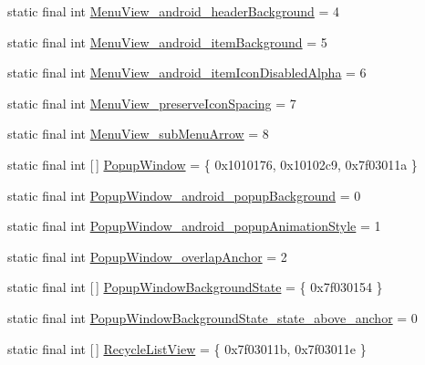 \begin{DoxyCompactItemize}
\item 
static final int \mbox{\hyperlink{classcom_1_1synnapps_1_1carouselview_1_1_r_1_1styleable_a17fdab04eb204e69fbcbed563676afb2}{Menu\+View\+\_\+android\+\_\+header\+Background}} = 4
\item 
static final int \mbox{\hyperlink{classcom_1_1synnapps_1_1carouselview_1_1_r_1_1styleable_aa55bae0fc19f133dc559536b1be7ed8b}{Menu\+View\+\_\+android\+\_\+item\+Background}} = 5
\item 
static final int \mbox{\hyperlink{classcom_1_1synnapps_1_1carouselview_1_1_r_1_1styleable_adb2be1da037bec8ef0a64ca3cefb3de7}{Menu\+View\+\_\+android\+\_\+item\+Icon\+Disabled\+Alpha}} = 6
\item 
static final int \mbox{\hyperlink{classcom_1_1synnapps_1_1carouselview_1_1_r_1_1styleable_a42f32d36d689c1de325eda857dc01e9e}{Menu\+View\+\_\+preserve\+Icon\+Spacing}} = 7
\item 
static final int \mbox{\hyperlink{classcom_1_1synnapps_1_1carouselview_1_1_r_1_1styleable_a616781a42431ad5f85efb4ff10d08d89}{Menu\+View\+\_\+sub\+Menu\+Arrow}} = 8
\item 
static final int \mbox{[}$\,$\mbox{]} \mbox{\hyperlink{classcom_1_1synnapps_1_1carouselview_1_1_r_1_1styleable_a8833d91df022e8350045960fdd9d6106}{Popup\+Window}} = \{ 0x1010176, 0x10102c9, 0x7f03011a \}
\item 
static final int \mbox{\hyperlink{classcom_1_1synnapps_1_1carouselview_1_1_r_1_1styleable_a630a70133d12b19b2500af51fb06df3f}{Popup\+Window\+\_\+android\+\_\+popup\+Background}} = 0
\item 
static final int \mbox{\hyperlink{classcom_1_1synnapps_1_1carouselview_1_1_r_1_1styleable_a50a01fce06eb8b14fae1e6f15f7f3cf5}{Popup\+Window\+\_\+android\+\_\+popup\+Animation\+Style}} = 1
\item 
static final int \mbox{\hyperlink{classcom_1_1synnapps_1_1carouselview_1_1_r_1_1styleable_af4d4712a00a9ea0f39cd1bc313597291}{Popup\+Window\+\_\+overlap\+Anchor}} = 2
\item 
static final int \mbox{[}$\,$\mbox{]} \mbox{\hyperlink{classcom_1_1synnapps_1_1carouselview_1_1_r_1_1styleable_a2197aa45b2a50d112fe0fd685c2a8299}{Popup\+Window\+Background\+State}} = \{ 0x7f030154 \}
\item 
static final int \mbox{\hyperlink{classcom_1_1synnapps_1_1carouselview_1_1_r_1_1styleable_a6f848bb987c5906511674e5eb6cbb72a}{Popup\+Window\+Background\+State\+\_\+state\+\_\+above\+\_\+anchor}} = 0
\item 
static final int \mbox{[}$\,$\mbox{]} \mbox{\hyperlink{classcom_1_1synnapps_1_1carouselview_1_1_r_1_1styleable_a52bebb9fc1b43605048e78bec310f3a6}{Recycle\+List\+View}} = \{ 0x7f03011b, 0x7f03011e \}

\end{DoxyCompactItemize}
